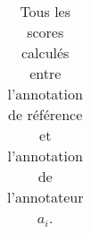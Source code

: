 \begin{table}[]
\begin{tabular}{|l|l|l|l|l|}
\end{tabular}
\label{tab:tousScoresAnnotateurs}
\caption{Tous les scores calculés entre l'annotation de référence et l'annotation de l'annotateur $a_i$. }
\end{table}
